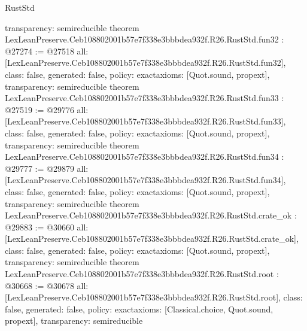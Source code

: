 \begin{lexlean}{RustStd}
\begin{coremodule}
{  transparency: semireducible
}
theorem LexLeanPreserve.Ceb108802001b57e7f338e3bbbdea932f.R26.RustStd.fun32 : @27274 := @27518 {
  all: [LexLeanPreserve.Ceb108802001b57e7f338e3bbbdea932f.R26.RustStd.fun32],
  class: false,
  generated: false,
  policy: exact{axioms: [Quot.sound, propext]},
  transparency: semireducible
}
theorem LexLeanPreserve.Ceb108802001b57e7f338e3bbbdea932f.R26.RustStd.fun33 : @27519 := @29776 {
  all: [LexLeanPreserve.Ceb108802001b57e7f338e3bbbdea932f.R26.RustStd.fun33],
  class: false,
  generated: false,
  policy: exact{axioms: [Quot.sound, propext]},
  transparency: semireducible
}
theorem LexLeanPreserve.Ceb108802001b57e7f338e3bbbdea932f.R26.RustStd.fun34 : @29777 := @29879 {
  all: [LexLeanPreserve.Ceb108802001b57e7f338e3bbbdea932f.R26.RustStd.fun34],
  class: false,
  generated: false,
  policy: exact{axioms: [Quot.sound, propext]},
  transparency: semireducible
}
theorem LexLeanPreserve.Ceb108802001b57e7f338e3bbbdea932f.R26.RustStd.crate_ok : @29883 := @30660 {
  all: [LexLeanPreserve.Ceb108802001b57e7f338e3bbbdea932f.R26.RustStd.crate_ok],
  class: false,
  generated: false,
  policy: exact{axioms: [Quot.sound, propext]},
  transparency: semireducible
}
theorem LexLeanPreserve.Ceb108802001b57e7f338e3bbbdea932f.R26.RustStd.root : @30668 := @30678 {
  all: [LexLeanPreserve.Ceb108802001b57e7f338e3bbbdea932f.R26.RustStd.root],
  class: false,
  generated: false,
  policy: exact{axioms: [Classical.choice, Quot.sound, propext]},
  transparency: semireducible
}


\end{coremodule}
\end{lexlean}
